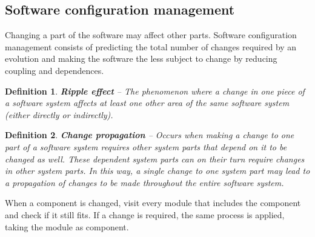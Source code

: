 \documentclass[a4paper,11pt]{report}
\newtheorem{definition}{Definition}
\begin{document}
	\subsection{Software configuration management}
		\noindent
		Changing a part of the software may
			affect other parts. Software
			configuration management consists 
			of predicting the total number
			of changes required by an evolution and
			making the software the less 
			subject to change by reducing
			coupling and dependences.
		\begin{definition}
			\textbf{Ripple effect} -- 
				The phenomenon where a change 
				in one piece of a software system
				affects at least one other area of 
				the same software system (either
				directly or indirectly).
		\end{definition}
		\begin{definition}
			\textbf{Change propagation} --
				Occurs when making a change to one 
				part of a software system
				requires other system parts that 
				depend on it to be changed as well.
				These dependent system parts can on 
				their turn require changes in
				other system parts. In this way, a 
				single change to one system part
				may lead to a propagation of changes 
				to be made throughout the
				entire software system.
		\end{definition}
		When a component is changed, visit every
			module that includes the component
			and check if it still fits.
			If a change is required, the same process
			is applied, taking the module as
			component.
%
\newpage
%
\end{document}
